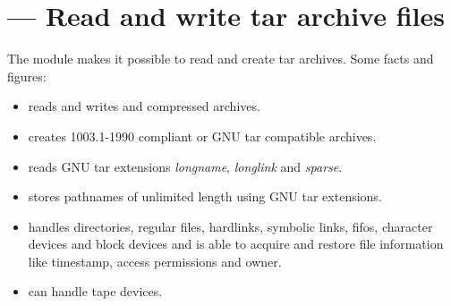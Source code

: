 \section{ --- Read and write tar archive files}



The  module makes it possible to read and create tar archives.
Some facts and figures:

\begin{itemize}
\item reads and writes  and  compressed archives.
\item creates \POSIX{} 1003.1-1990 compliant or GNU tar compatible archives.
\item reads GNU tar extensions \emph{longname}, \emph{longlink} and
      \emph{sparse}.
\item stores pathnames of unlimited length using GNU tar extensions.
\item handles directories, regular files, hardlinks, symbolic links, fifos,
      character devices and block devices and is able to acquire and
      restore file information like timestamp, access permissions and owner.
\item can handle tape devices.
\end{itemize}

